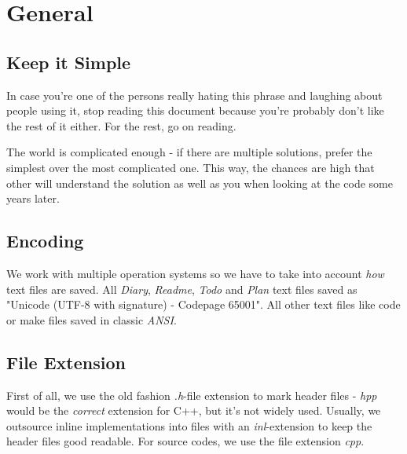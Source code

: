 \chapter{General}




\section{Keep it Simple}
In case you're one of the persons really hating this phrase and laughing about people using it, stop reading this document because you're probably don't like the rest of it either. For the rest, go on reading.

The world is complicated enough - if there are multiple solutions, prefer the simplest over the most complicated one. This way, the chances are high that other will understand the solution as well as you when looking at the code some years later.




\section{Encoding}
We work with multiple operation systems so we have to take into account \emph{how} text files are saved. All \emph{Diary}, \emph{Readme}, \emph{Todo} and \emph{Plan} text files saved as "Unicode (UTF-8 with signature) - Codepage 65001". All other text files like code or make files saved in classic \emph{ANSI}.




\section{File Extension}
First of all, we use the old fashion \emph{.h}-file extension to mark header files - \emph{hpp} would be the \emph{correct} extension for C++, but it's not widely used. Usually, we outsource inline implementations into files with an \emph{inl}-extension to keep the header files good readable. For source codes, we use the file extension \emph{cpp}.




